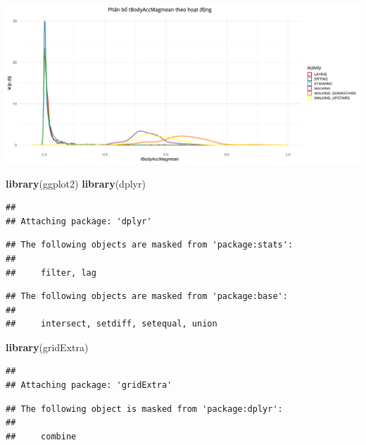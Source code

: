 \documentclass[
]{article}
\newenvironment{Shaded}{\begin{snugshade}}{\end{snugshade}}
\newcommand{\FunctionTok}[1]{\textcolor[rgb]{0.13,0.29,0.53}{\textbf{#1}}}
\newcommand{\NormalTok}[1]{#1}
\begin{document}
\includegraphics{report_files/figure-latex/unnamed-chunk-13-1.pdf}

\begin{Shaded}
\begin{Highlighting}[]
\FunctionTok{library}\NormalTok{(ggplot2)}
\FunctionTok{library}\NormalTok{(dplyr)}
\end{Highlighting}
\end{Shaded}

\begin{verbatim}
## 
## Attaching package: 'dplyr'
\end{verbatim}

\begin{verbatim}
## The following objects are masked from 'package:stats':
## 
##     filter, lag
\end{verbatim}

\begin{verbatim}
## The following objects are masked from 'package:base':
## 
##     intersect, setdiff, setequal, union
\end{verbatim}

\begin{Shaded}
\begin{Highlighting}[]
\FunctionTok{library}\NormalTok{(gridExtra)}
\end{Highlighting}
\end{Shaded}

\begin{verbatim}
## 
## Attaching package: 'gridExtra'
\end{verbatim}

\begin{verbatim}
## The following object is masked from 'package:dplyr':
## 
##     combine
\end{verbatim}
\end{document}
